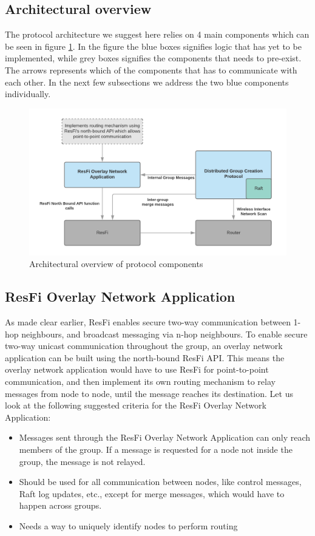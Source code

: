 \subsection{Architectural overview}
The protocol architecture we suggest here relies on 4 main components which can be seen in figure \ref{fig:dgcpoverview}.
In the figure the blue boxes signifies logic that has yet to be implemented, while grey boxes signifies the components that needs to pre-exist. The arrows
represents which of the components that has to communicate with each other. In the next few subsections we address the two blue components individually.


\begin{figure}
	\includegraphics[width=\textwidth]{Images/dgcpoverview.png}
		\caption{Architectural overview of protocol components }%
		\label{fig:dgcpoverview}%
\end{figure}


\subsection{ResFi Overlay Network Application}
As made clear earlier, ResFi enables secure two-way communication between 1-hop neighbours, and broadcast messaging via n-hop neighbours. 
To enable secure two-way unicast communication throughout the group, an overlay network application can be built using the north-bound ResFi API. 
This means the overlay network application would have to use ResFi for point-to-point communication, and then implement its own routing mechanism
to relay messages from node to node, until the message reaches its destination. Let us look at the following suggested criteria for the ResFi Overlay Network Application:

\begin{itemize}
	\item Messages sent through the ResFi Overlay Network Application can only reach members of the group. If a message is requested for a node not inside the group,
		the message is not relayed.
  \item Should be used for all communication between nodes, like control messages, Raft log updates, etc., except for merge messages, which would have to happen across
		groups. 
	\item Needs a way to uniquely identify nodes to perform routing
\end{itemize}



